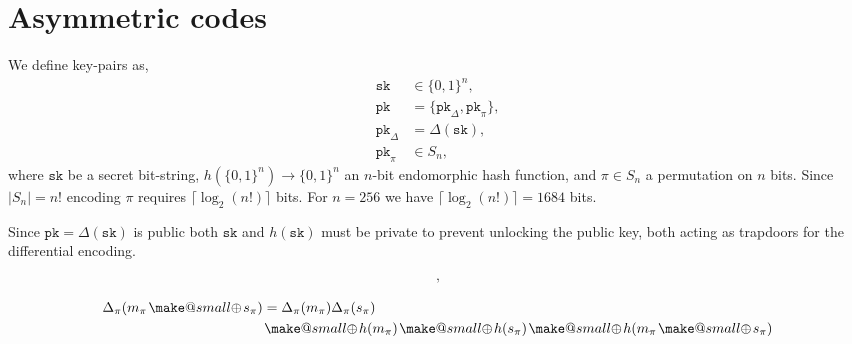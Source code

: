 \documentclass[twocolumn, aps, amsmath, amssymb, nofootinbib, superscriptaddress, longbibliography, doublefloatfix, table-of-contents, eqsecnum, rmp]{revtex4-2}
\makeatletter
\newcommand{\soplus}{{{\hspace{1pt}}{\mathbin{\mathpalette\make@small{\mathbin\oplus}}}}{\hspace{1pt}}}
\newcommand{\make@small}[2]{%
  \vcenter{\hbox{%
    \scalebox{0.6}{$\m@th#1#2$}%
  }}%
}
\makeatother
\begin{document}
\section{Asymmetric codes}

We define key-pairs as,
\begin{align}
	\mathtt{sk} &\in \{0,1\}^n, \nonumber\\
	\mathtt{pk} &= \{\mathtt{pk}_\Delta,\mathtt{pk}_\pi\},\nonumber\\
	\mathtt{pk}_\Delta &= \Delta(\mathtt{sk}),\nonumber\\
	\mathtt{pk}_\pi &\in S_n,
\end{align}
where $\mathtt{sk}$ be a secret bit-string, $h(\{0,1\}^n)\to\{0,1\}^n$ an $n$-bit endomorphic hash function, and $\pi\in S_n$ a permutation on $n$ bits. Since $|S_n|=n!$ encoding $\pi$ requires $\lceil\log_2(n!)\rceil$ bits. For $n=256$ we have $\lceil\log_2(n!)\rceil = 1684$ bits.

Since $\mathtt{pk} = \Delta(\mathtt{sk})$ is public both $\mathtt{sk}$ and $h(\mathtt{sk})$ must be private to prevent unlocking the public key, both acting as trapdoors for the differential encoding.



\begin{align}
	[m_\pi \soplus s_\pi, \Delta_\pi(m_\pi\soplus s_\pi)],
\end{align}

\begin{align}
	\Delta_\pi(m_\pi\soplus s_\pi) &= \Delta_\pi(m_\pi) \Delta_\pi(s_\pi) \nonumber\\
	&\soplus h(m_\pi) \soplus h(s_\pi) \soplus h(m_\pi \soplus s_\pi)
\end{align}

\end{document}

